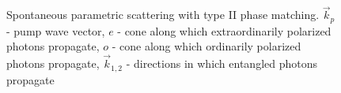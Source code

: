 \begin{figure}
\centering


\caption{Spontaneous parametric scattering with type II phase matching. $\vec{k}_p$ - pump wave vector, $e$ - cone along which extraordinarily polarized photons propagate, $o$ - cone along which ordinarily polarized photons propagate, $\vec{k}_{1,2}$ - directions in which entangled photons propagate}
\label{figEntangGen}
\end{figure}